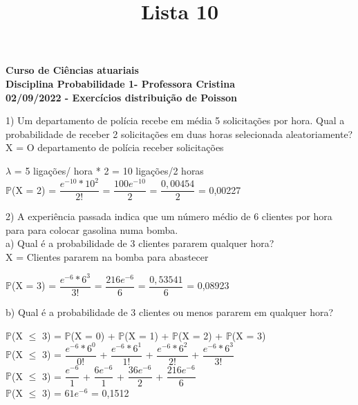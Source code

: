 \documentclass[12pt,a4paper]{article}
\title{Lista 10}
\date{}
\begin{document}
	\maketitle
	\begin{center}
		\textbf{Curso de Ciências atuariais}\\
		\textbf{Disciplina Probabilidade 1- Professora Cristina}\\
		\textbf{02/09/2022 - Exercícios distribuição de Poisson}
	\end{center}
	1) Um departamento de polícia recebe em média 5 solicitações por hora. Qual a probabilidade de	receber 2 solicitações em duas horas selecionada aleatoriamente?
	\vspace{0.5cm}\\
	X = O departamento de polícia receber solicitações
	\begin{center}
		\vspace{0.5cm}
		$\lambda$ = 5 ligações/ hora * 2 = 10 ligações/2 horas\\
		\vspace{1cm}
		$\mathbb{P}$(X = 2) = $\dfrac{e^{-10} * 10^{2}}{2!}$ = $\dfrac{100e^{-10}}{2}$ = $\dfrac{0,00454}{2}$ = 0,00227 
	\end{center}
	\vspace{1cm}
	2) A experiência passada indica que um número médio de 6 clientes por hora para para colocar gasolina numa bomba.\\
	a) Qual é a probabilidade de 3 clientes pararem qualquer hora?
	\vspace{0.5cm}\\
	X = Clientes pararem na bomba para abastecer
	\begin{center}
		\vspace{0.5cm}
		$\mathbb{P}$(X = 3) = $\dfrac{e^{-6} * 6^{3}}{3!}$ = $\dfrac{216e^{-6}}{6}$ = $\dfrac{0,53541}{6}$ = 0,08923 
	\end{center}
	\vspace{1cm}
	b) Qual é a probabilidade de 3 clientes ou menos pararem em qualquer hora?
	\begin{center}
		\vspace{0.5cm}
		$\mathbb{P}$(X $\leq$ 3) = $\mathbb{P}$(X = 0) + $\mathbb{P}$(X = 1) + $\mathbb{P}$(X = 2) + $\mathbb{P}$(X = 3)
		\vspace{0.5cm}\\
		$\mathbb{P}$(X $\leq$ 3) = $\dfrac{e^{-6} * 6^{0}}{0!}$ + $\dfrac{e^{-6} * 6^{1}}{1!}$ + $\dfrac{e^{-6} * 6^{2}}{2!}$ + $\dfrac{e^{-6} * 6^{3}}{3!}$
		\vspace{0.5cm}\\
		$\mathbb{P}$(X $\leq$ 3) =  $\dfrac{e^{-6}}{1}$ + $\dfrac{6e^{-6}}{1}$ + $\dfrac{36e^{-6}}{2}$ + $\dfrac{216e^{-6}}{6}$
		\vspace{0.5cm}\\
		$\mathbb{P}$(X $\leq$ 3) = ${61e^{-6}}$ = 0,1512
	\end{center}
\end{document}
